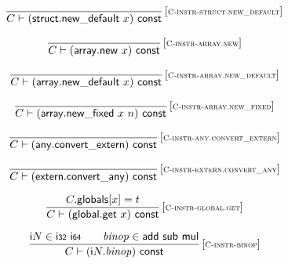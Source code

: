 $$
\begin{array}{@{}c@{}}\displaystyle
\frac{
}{
C \vdash (\mathsf{struct{.}new\_default}~x)~\mathsf{const}
} \, {[\textsc{\scriptsize C{-}instr{-}struct.new\_default}]}
\qquad
\end{array}
$$

$$
\begin{array}{@{}c@{}}\displaystyle
\frac{
}{
C \vdash (\mathsf{array{.}new}~x)~\mathsf{const}
} \, {[\textsc{\scriptsize C{-}instr{-}array.new}]}
\qquad
\end{array}
$$

$$
\begin{array}{@{}c@{}}\displaystyle
\frac{
}{
C \vdash (\mathsf{array{.}new\_default}~x)~\mathsf{const}
} \, {[\textsc{\scriptsize C{-}instr{-}array.new\_default}]}
\qquad
\end{array}
$$

$$
\begin{array}{@{}c@{}}\displaystyle
\frac{
}{
C \vdash (\mathsf{array{.}new\_fixed}~x~n)~\mathsf{const}
} \, {[\textsc{\scriptsize C{-}instr{-}array.new\_fixed}]}
\qquad
\end{array}
$$

$$
\begin{array}{@{}c@{}}\displaystyle
\frac{
}{
C \vdash (\mathsf{any{.}convert\_extern})~\mathsf{const}
} \, {[\textsc{\scriptsize C{-}instr{-}any.convert\_extern}]}
\qquad
\end{array}
$$

$$
\begin{array}{@{}c@{}}\displaystyle
\frac{
}{
C \vdash (\mathsf{extern{.}convert\_any})~\mathsf{const}
} \, {[\textsc{\scriptsize C{-}instr{-}extern.convert\_any}]}
\qquad
\end{array}
$$

$$
\begin{array}{@{}c@{}}\displaystyle
\frac{
C{.}\mathsf{globals}{}[x] = t
}{
C \vdash (\mathsf{global{.}get}~x)~\mathsf{const}
} \, {[\textsc{\scriptsize C{-}instr{-}global.get}]}
\qquad
\end{array}
$$

$$
\begin{array}{@{}c@{}}\displaystyle
\frac{
{\mathsf{i}}{N} \in \mathsf{i{\scriptstyle 32}}~\mathsf{i{\scriptstyle 64}}
 \qquad
{\mathit{binop}} \in \mathsf{add}~\mathsf{sub}~\mathsf{mul}
}{
C \vdash ({\mathsf{i}}{N} {.} {\mathit{binop}})~\mathsf{const}
} \, {[\textsc{\scriptsize C{-}instr{-}binop}]}
\qquad
\end{array}
$$

